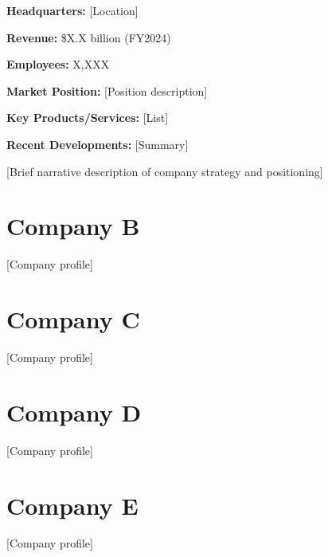 \documentclass[11pt,letterpaper]{report}
\begin{document}
\begin{calloutbox}
\textbf{Headquarters:} [Location]

\textbf{Revenue:} \$X.X billion (FY2024)

\textbf{Employees:} X,XXX

\textbf{Market Position:} [Position description]

\textbf{Key Products/Services:} [List]

\textbf{Recent Developments:} [Summary]
\end{calloutbox}

[Brief narrative description of company strategy and positioning]

\section{Company B}
[Company profile]

\section{Company C}
[Company profile]

\section{Company D}
[Company profile]

\section{Company E}
[Company profile]

\newpage



%
%
%

\end{document}
